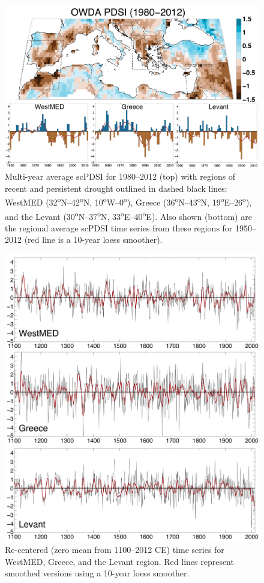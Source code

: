 \documentclass[draft,jgr]{AGUTeX}
\begin{document}
\begin{figure}
\center
\includegraphics[width=1.0\columnwidth]{fig_10_map_bar_pdsi.png}
\caption{Multi-year average scPDSI for 1980--2012 (top) with regions of recent and persistent drought outlined in dashed black lines: WestMED (32\textsuperscript{o}N--42\textsuperscript{o}N, 10\textsuperscript{o}W--0\textsuperscript{o}), Greece (36\textsuperscript{o}N--43\textsuperscript{o}N, 19\textsuperscript{o}E--26\textsuperscript{o}), and the Levant (30\textsuperscript{o}N--37\textsuperscript{o}N, 33\textsuperscript{o}E--40\textsuperscript{o}E). Also shown (bottom) are the regional average scPDSI time series from these regions for 1950--2012 (red line is a 10-year loess smoother).}\label{placeholder}
\end{figure}

\begin{figure}
\center
\includegraphics[width=0.9\columnwidth]{fig_11_regional_series_MED1.png}
\caption{Re-centered (zero mean from 1100--2012 CE) time series for WestMED, Greece, and the Levant region. Red lines represent smoothed versions using a 10-year loess smoother.}\label{placeholder}
\end{figure}
\end{document}
